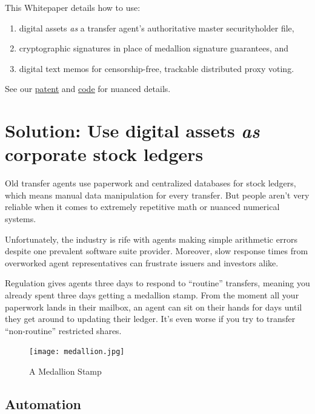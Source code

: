 \documentclass[11pt, english]{article}
\begin{document}
\begin{multicols}{2}
\noindent This Whitepaper details how to use: \begin{enumerate}
    \item digital assets \textit{as} a transfer agent's authoritative master securityholder file,
    
    \item cryptographic signatures in place of medallion signature guarantees, and
    
    \item digital text memos for censorship-free, trackable distributed proxy voting.
\end{enumerate}
See our \underline{\href{https://patentcenter.uspto.gov/applications/17396742}{patent}} and \underline{\href{https://github.com/blocktransfer/}{code}} for nuanced details.



\section{Solution: Use digital assets \textit{as} corporate stock ledgers}

Old transfer agents use paperwork and centralized databases for stock ledgers, which means manual data manipulation for every transfer. But people aren't very reliable when it comes to extremely repetitive math or nuanced numerical systems.

Unfortunately, the industry is rife with agents making simple arithmetic errors despite one prevalent software suite provider. Moreover, slow response times from overworked agent representatives can frustrate issuers and investors alike.

Regulation gives agents three days to respond to ``routine'' transfers, meaning you already spent three days getting a medallion stamp. From the moment all your paperwork lands in their mailbox, an agent can sit on their hands for days until they get around to updating their ledger. It's even worse if you try to transfer ``non-routine'' restricted shares. 

\begin{figure}[H]
    \centering
    \texttt{[image: medallion.jpg]}
    \caption{A Medallion Stamp}
    \label{fig:decentralized}
\end{figure}


\subsection{Automation}


\end{multicols}
\end{document}

